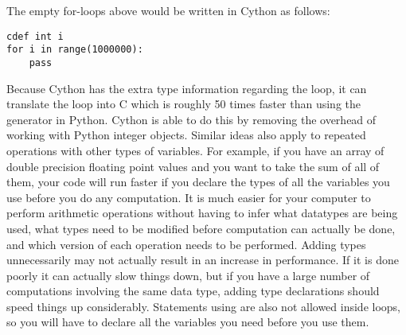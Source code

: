The empty for-loops above would be written in Cython as follows:
\begin{lstlisting}
cdef int i
for i in range(1000000):
    pass
\end{lstlisting}
Because Cython has the extra type information regarding the loop, it can translate the loop into C which is roughly 50 times faster than using the generator in Python.
Cython is able to do this by removing the overhead of working with Python integer objects.
Similar ideas also apply to repeated operations with other types of variables.
For example, if you have an array of double precision floating point values and you want to take the sum of all of them, your code will run faster if you declare the types of all the variables you use before you do any computation.
It is much easier for your computer to perform arithmetic operations without having to infer what datatypes are being used, what types need to be modified before computation can actually be done, and which version of each operation needs to be performed.
Adding types unnecessarily may not actually result in an increase in performance. If it is done poorly it can actually slow things down, but if you have a large number of computations involving the same data type, adding type declarations should speed things up considerably.
Statements using  are also not allowed inside loops, so you will have to declare all the variables you need before you use them.

